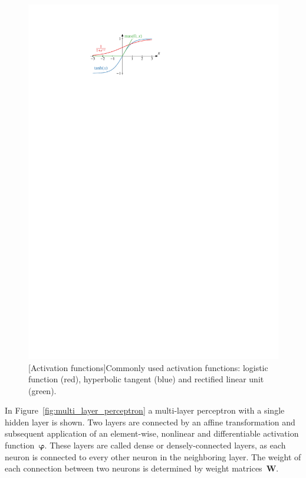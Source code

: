 \begin{figure}[htb]
\begin{minipage}[t]{0.4\textwidth}
    \includegraphics{./figures/theory/activation_functions.pdf}
    [Activation functions]{Commonly used activation
      functions: logistic function (red), hyperbolic tangent (blue) and
      rectified linear unit (green).}
    \label{fig:activation_functions}
  \end{minipage}
\end{figure}
In Figure~\ref{fig:multi_layer_perceptron} a multi-layer perceptron with a
single hidden layer is shown. Two layers are connected by an affine
transformation and subsequent application of an element-wise, nonlinear and
differentiable activation function~$\bm{\varphi}$. These layers are called dense
or densely-connected layers, as each neuron is connected to every other neuron
in the neighboring layer. The weight of each connection between two neurons is
determined by weight matrices~$\mathbf{W}$.
